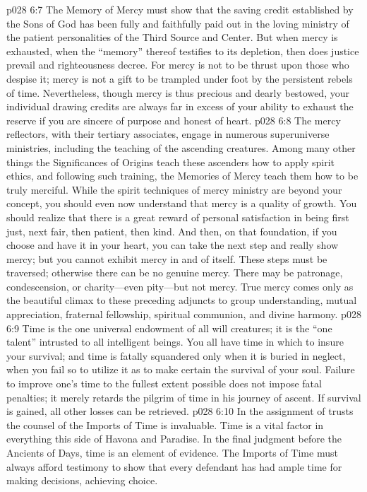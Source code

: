\vs p028 6:7 The Memory of Mercy must show that the saving credit established by the Sons of God has been fully and faithfully paid out in the loving ministry of the patient personalities of the Third Source and Center. But when mercy is exhausted, when the “memory” thereof testifies to its depletion, then does justice prevail and righteousness decree. For mercy is not to be thrust upon those who despise it; mercy is not a gift to be trampled under foot by the persistent rebels of time. Nevertheless, though mercy is thus precious and dearly bestowed, your individual drawing credits are always far in excess of your ability to exhaust the reserve if you are sincere of purpose and honest of heart.
\pc \vs p028 6:8 The mercy reflectors, with their tertiary associates, engage in numerous superuniverse ministries, including the teaching of the ascending creatures. Among many other things the Significances of Origins teach these ascenders how to apply spirit ethics, and following such training, the Memories of Mercy teach them how to be truly merciful. While the spirit techniques of mercy ministry are beyond your concept, you should even now understand that mercy is a quality of growth. You should realize that there is a great reward of personal satisfaction in being first just, next fair, then patient, then kind. And then, on that foundation, if you choose and have it in your heart, you can take the next step and really show mercy; but you cannot exhibit mercy in and of itself. These steps must be traversed; otherwise there can be no genuine mercy. There may be patronage, condescension, or charity---even pity---but not mercy. True mercy comes only as the beautiful climax to these preceding adjuncts to group understanding, mutual appreciation, fraternal fellowship, spiritual communion, and divine harmony.
\pc \vs p028 6:9 \bibnobreakspace {} Time is the one universal endowment of all will creatures; it is the “one talent” intrusted to all intelligent beings. You all have time in which to insure your survival; and time is fatally squandered only when it is buried in neglect, when you fail so to utilize it as to make certain the survival of your soul. Failure to improve one’s time to the fullest extent possible does not impose fatal penalties; it merely retards the pilgrim of time in his journey of ascent. If survival is gained, all other losses can be retrieved.
\vs p028 6:10 In the assignment of trusts the counsel of the Imports of Time is invaluable. Time is a vital factor in everything this side of Havona and Paradise. In the final judgment before the Ancients of Days, time is an element of evidence. The Imports of Time must always afford testimony to show that every defendant has had ample time for making decisions, achieving choice.
